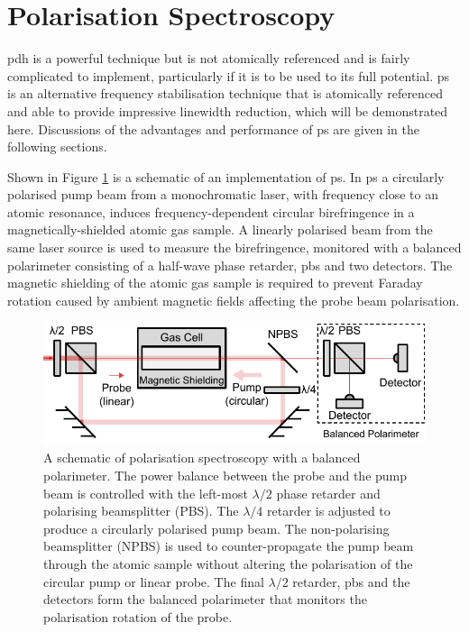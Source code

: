 \section{Polarisation Spectroscopy}%
\label{section:pol_spec_theory}

\Gls{pdh} is a powerful technique but is not atomically referenced and is fairly complicated to implement, particularly if it is to be used to its full potential.
\Gls{ps} is an alternative frequency stabilisation technique that is atomically referenced and able to provide impressive linewidth reduction, which will be demonstrated here.
Discussions of the advantages and performance of \gls{ps} are given in the following sections.

Shown in Figure \ref{figure:pol_spec_schematic} is a schematic of an implementation of \gls{ps}.
In \gls{ps} a circularly polarised pump beam from a monochromatic laser, with frequency close to an atomic resonance, induces frequency-dependent circular birefringence in a magnetically-shielded atomic gas sample.
A linearly polarised beam from the same laser source is used to measure the birefringence, monitored with a balanced polarimeter consisting of a half-wave phase retarder, \gls{pbs} and two detectors.
The magnetic shielding of the atomic gas sample is required to prevent Faraday rotation caused by ambient magnetic fields affecting the probe beam polarisation.

\begin{figure}
\centering
\includegraphics[width=\linewidth]{part1/Figs/PolSpecSchematic.pdf}
\caption[Polarisation spectroscopy setup.]{A schematic of polarisation spectroscopy with a balanced polarimeter.
The power balance between the probe and the pump beam is controlled with the left-most $\lambda/2$ phase retarder and polarising beamsplitter (PBS).
The $\lambda/4$ retarder is adjusted to produce a circularly polarised pump beam.
The non-polarising beamsplitter (NPBS) is used to counter-propagate the pump beam through the atomic sample without altering the polarisation of the circular pump or linear probe.
The final $\lambda/2$ retarder, \gls{pbs} and the detectors form the balanced polarimeter that monitors the polarisation rotation of the probe.}
\label{figure:pol_spec_schematic}
\end{figure}

